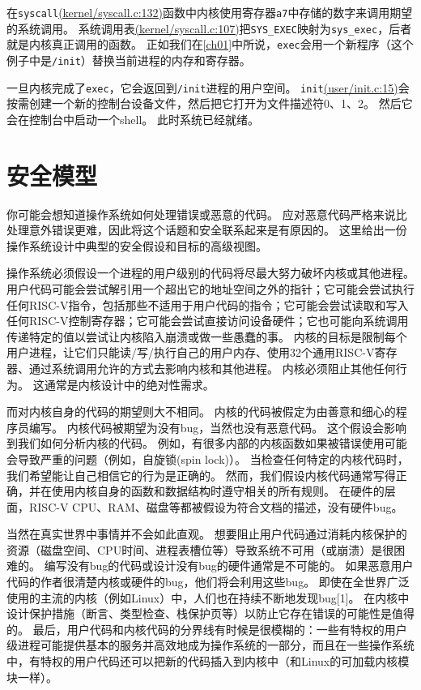 在\texttt{syscall}\href{https://github.com/mit-pdos/xv6-riscv/blob/risc/kernel/syscall.c#L132}{(kernel/syscall.c:132)}函数中内核使用寄存器\texttt{a7}中存储的数字来调用期望的系统调用。
系统调用表\href{https://github.com/mit-pdos/xv6-riscv/blob/risc/kernel/syscall.c#L107}{(kernel/syscall.c:107)}把\texttt{SYS\_EXEC}映射为\texttt{sys\_exec}，后者就是内核真正调用的函数。
正如我们在\autoref{ch01}中所说，\texttt{exec}会用一个新程序（这个例子中是\texttt{/init}）替换当前进程的内存和寄存器。

一旦内核完成了\texttt{exec}，它会返回到\texttt{/init}进程的用户空间。
\texttt{init}\href{https://github.com/mit-pdos/xv6-riscv/blob/risc/user/init.c#L15}{(user/init.c:15)}会按需创建一个新的控制台设备文件，然后把它打开为文件描述符0、1、2。
然后它会在控制台中启动一个shell。
此时系统已经就绪。

\section{安全模型}
你可能会想知道操作系统如何处理错误或恶意的代码。
应对恶意代码严格来说比处理意外错误更难，因此将这个话题和安全联系起来是有原因的。
这里给出一份操作系统设计中典型的安全假设和目标的高级视图。

操作系统必须假设一个进程的用户级别的代码将尽最大努力破坏内核或其他进程。
用户代码可能会尝试解引用一个超出它的地址空间之外的指针；它可能会尝试执行任何RISC-V指令，包括那些不适用于用户代码的指令；它可能会尝试读取和写入任何RISC-V控制寄存器；它可能会尝试直接访问设备硬件；它也可能向系统调用传递特定的值以尝试让内核陷入崩溃或做一些愚蠢的事。
内核的目标是限制每个用户进程，让它们只能读/写/执行自己的用户内存、使用32个通用RISC-V寄存器、通过系统调用允许的方式去影响内核和其他进程。
内核必须阻止其他任何行为。
这通常是内核设计中的绝对性需求。

而对内核自身的代码的期望则大不相同。
内核的代码被假定为由善意和细心的程序员编写。
内核代码被期望为没有bug，当然也没有恶意代码。
这个假设会影响到我们如何分析内核的代码。
例如，有很多内部的内核函数如果被错误使用可能会导致严重的问题（例如，自旋锁(spin lock)）。
当检查任何特定的内核代码时，我们希望能让自己相信它的行为是正确的。
然而，我们假设内核代码通常写得正确，并在使用内核自身的函数和数据结构时遵守相关的所有规则。
在硬件的层面，RISC-V CPU、RAM、磁盘等都被假设为符合文档的描述，没有硬件bug。

当然在真实世界中事情并不会如此直观。
想要阻止用户代码通过消耗内核保护的资源（磁盘空间、CPU时间、进程表槽位等）导致系统不可用（或崩溃）是很困难的。
编写没有bug的代码或设计没有bug的硬件通常是不可能的。
如果恶意用户代码的作者很清楚内核或硬件的bug，他们将会利用这些bug。
即使在全世界广泛使用的主流的内核（例如Linux）中，人们也在持续不断地发现bug[1]。
在内核中设计保护措施（断言、类型检查、栈保护页等）以防止它存在错误的可能性是值得的。
最后，用户代码和内核代码的分界线有时候是很模糊的：一些有特权的用户级进程可能提供基本的服务并高效地成为操作系统的一部分，而且在一些操作系统中，有特权的用户代码还可以把新的代码插入到内核中（和Linux的可加载内核模块一样）。

